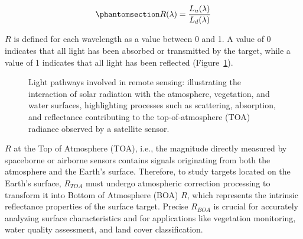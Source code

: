 \documentclass[
  letterpaper,
  11pt,
  english,
  singlespacing,
  headsepline]{MastersDoctoralThesis}
\begin{document}
\begin{spacing}{1.5}
\begin{equation}\phantomsection\label{eq-reflectance}{
R(\lambda) = \frac{L_u(\lambda)}{L_d(\lambda)}
}\end{equation}

\(R\) is defined for each wavelength as a value between 0 and 1. A value
of 0 indicates that all light has been absorbed or transmitted by the
target, while a value of 1 indicates that all light has been reflected
(Figure~\ref{fig-FigLightPath}).

\begin{figure}


\caption{\label{fig-FigLightPath}Light pathways involved in remote
sensing: illustrating the interaction of solar radiation with the
atmosphere, vegetation, and water surfaces, highlighting processes such
as scattering, absorption, and reflectance contributing to the
top-of-atmosphere (TOA) radiance observed by a satellite sensor.}

\end{figure}%

\(R\) at the Top of Atmosphere (TOA), i.e., the magnitude directly
measured by spaceborne or airborne sensors contains signals originating
from both the atmosphere and the Earth's surface. Therefore, to study
targets located on the Earth's surface, \(R_{TOA}\) must undergo
atmospheric correction processing to transform it into Bottom of
Atmosphere (BOA) \(R\), which represents the intrinsic reflectance
properties of the surface target. Precise \(R_{BOA}\) is crucial for
accurately analyzing surface characteristics and for applications like
vegetation monitoring, water quality assessment, and land cover
classification.


\end{spacing}
\end{document}
